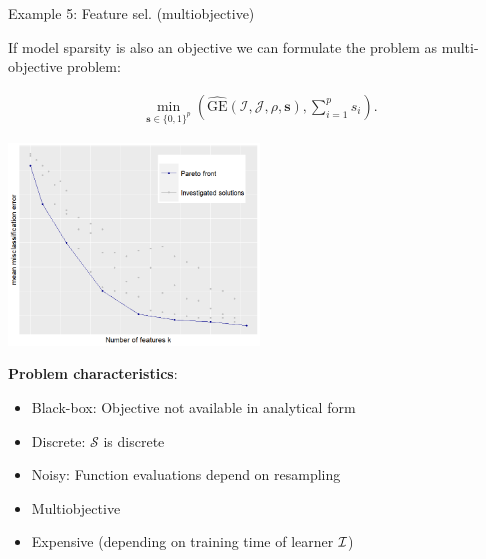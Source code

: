 \documentclass[11pt,compress,t,notes=noshow, xcolor=table]{beamer}
\begin{document}
\begin{vbframe}{Example 5: Feature sel. (multiobjective)}

If model sparsity is also an objective we can formulate the problem as multi-objective problem:

  \begin{eqnarray*}
    \min_{\textbf{s} \in \{0, 1\}^p} \left(\widehat{\text{GE}}(\mathcal{I}, \mathcal{J}, \rho, \bm{s}), \sum\nolimits_{i = 1}^p s_i\right). 
  \end{eqnarray*}

    \begin{center}
            \includegraphics[width= 0.5\textwidth]{figure_man/pareto.png}
    \end{center}



\framebreak

\textbf{Problem characteristics}:
\begin{itemize}
	\item Black-box: Objective not available in analytical form
	\item Discrete: $\mathcal{S}$ is discrete
	\item Noisy: Function evaluations depend on resampling	
	\item Multiobjective
	\item Expensive (depending on training time of learner $\mathcal{I}$)	
\end{itemize}

\end{vbframe}
\end{document}
